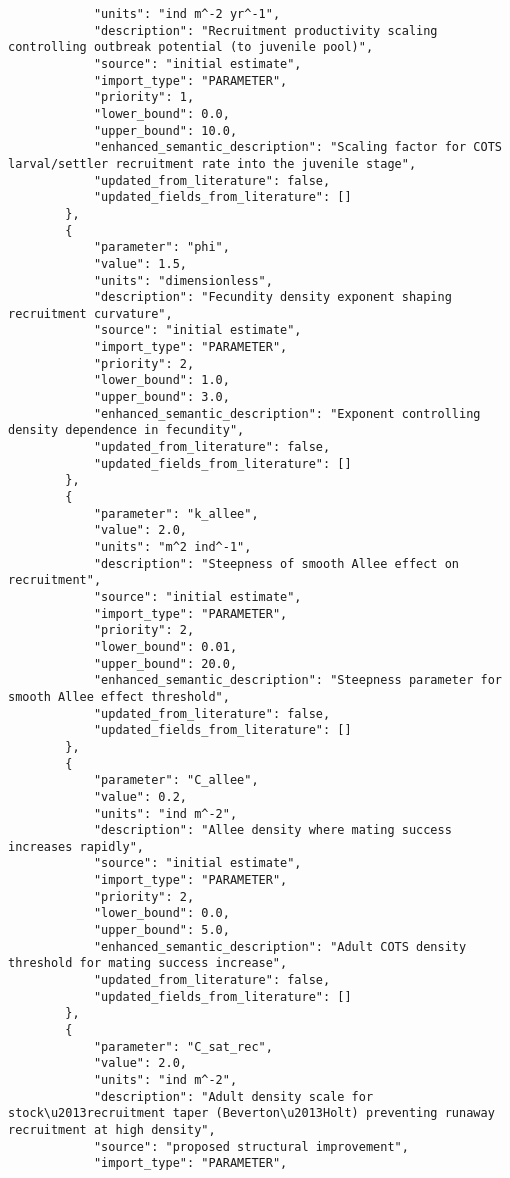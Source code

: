 \begin{lstlisting}
            "units": "ind m^-2 yr^-1",
            "description": "Recruitment productivity scaling controlling outbreak potential (to juvenile pool)",
            "source": "initial estimate",
            "import_type": "PARAMETER",
            "priority": 1,
            "lower_bound": 0.0,
            "upper_bound": 10.0,
            "enhanced_semantic_description": "Scaling factor for COTS larval/settler recruitment rate into the juvenile stage",
            "updated_from_literature": false,
            "updated_fields_from_literature": []
        },
        {
            "parameter": "phi",
            "value": 1.5,
            "units": "dimensionless",
            "description": "Fecundity density exponent shaping recruitment curvature",
            "source": "initial estimate",
            "import_type": "PARAMETER",
            "priority": 2,
            "lower_bound": 1.0,
            "upper_bound": 3.0,
            "enhanced_semantic_description": "Exponent controlling density dependence in fecundity",
            "updated_from_literature": false,
            "updated_fields_from_literature": []
        },
        {
            "parameter": "k_allee",
            "value": 2.0,
            "units": "m^2 ind^-1",
            "description": "Steepness of smooth Allee effect on recruitment",
            "source": "initial estimate",
            "import_type": "PARAMETER",
            "priority": 2,
            "lower_bound": 0.01,
            "upper_bound": 20.0,
            "enhanced_semantic_description": "Steepness parameter for smooth Allee effect threshold",
            "updated_from_literature": false,
            "updated_fields_from_literature": []
        },
        {
            "parameter": "C_allee",
            "value": 0.2,
            "units": "ind m^-2",
            "description": "Allee density where mating success increases rapidly",
            "source": "initial estimate",
            "import_type": "PARAMETER",
            "priority": 2,
            "lower_bound": 0.0,
            "upper_bound": 5.0,
            "enhanced_semantic_description": "Adult COTS density threshold for mating success increase",
            "updated_from_literature": false,
            "updated_fields_from_literature": []
        },
        {
            "parameter": "C_sat_rec",
            "value": 2.0,
            "units": "ind m^-2",
            "description": "Adult density scale for stock\u2013recruitment taper (Beverton\u2013Holt) preventing runaway recruitment at high density",
            "source": "proposed structural improvement",
            "import_type": "PARAMETER",

\end{lstlisting}
